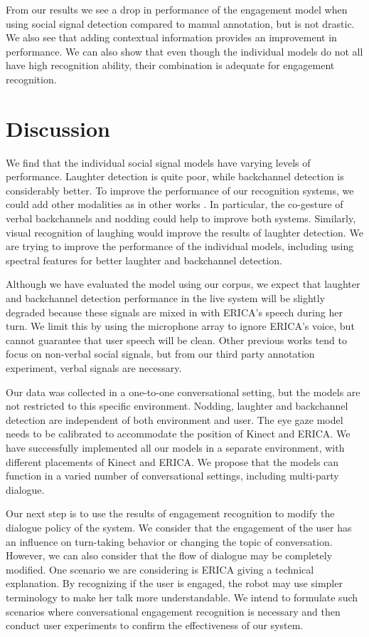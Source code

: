 \documentclass[letterpaper]{article} %
\begin{document}
From our results we see a drop in performance of the engagement model when using social signal detection compared to manual annotation, but is not drastic. We also see that adding contextual information provides an improvement in performance. We can also show that even though the individual models do not all have high recognition ability, their combination is adequate for engagement recognition.

\section{Discussion}
We find that the individual social signal models have varying levels of performance. Laughter detection is quite poor, while backchannel detection is considerably better. To improve the performance of our recognition systems, we could add other modalities as in other works \cite{Morency2005}. In particular, the co-gesture of verbal backchannels and nodding could help to improve both systems. Similarly, visual recognition of laughing would improve the results of laughter detection. We are trying to improve the performance of the individual models, including using spectral features for better laughter and backchannel detection.

Although we have evaluated the model using our corpus, we expect that laughter and backchannel detection performance in the live system will be slightly degraded because these signals are mixed in with ERICA's speech during her turn. We limit this by using the microphone array to ignore ERICA's voice, but cannot guarantee that user speech will be clean. Other previous works tend to focus on non-verbal social signals, but from our third party annotation experiment, verbal signals are necessary.

Our data was collected in a one-to-one conversational setting, but the models are not restricted to this specific environment. Nodding, laughter and backchannel detection are independent of both environment and user. The eye gaze model needs to be calibrated to accommodate the position of Kinect and ERICA. We have successfully implemented all our models in a separate environment, with different placements of Kinect and ERICA. We propose that the models can function in a varied number of conversational settings, including multi-party dialogue.

Our next step is to use the results of engagement recognition to modify the dialogue policy of the system. We consider that the engagement of the user has an influence on turn-taking behavior or changing the topic of conversation. However, we can also consider that the flow of dialogue may be completely modified. One scenario we are considering is ERICA giving a technical explanation. By recognizing if the user is engaged, the robot may use simpler terminology to make her talk more understandable. We intend to formulate such scenarios where conversational engagement recognition is necessary and then conduct user experiments to confirm the effectiveness of our system.
\end{document}

